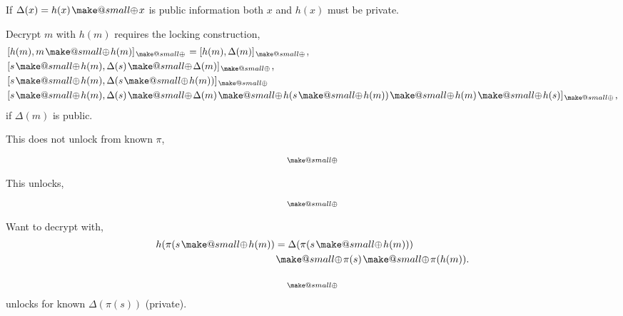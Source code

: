\documentclass[twocolumn, aps, amsmath, amssymb, nofootinbib, superscriptaddress, longbibliography, doublefloatfix, table-of-contents, eqsecnum, rmp]{revtex4-2}
\makeatletter
\newcommand{\soplus}{{{\hspace{1pt}}{\mathbin{\mathpalette\make@small{\mathbin\oplus}}}}{\hspace{1pt}}}
\newcommand{\make@small}[2]{%
  \vcenter{\hbox{%
    \scalebox{0.6}{$\m@th#1#2$}%
  }}%
}
\makeatother
\begin{document}
If $\Delta(x)=h(x)\soplus x$ is public information both $x$ and $h(x)$ must be private.

Decrypt $m$ with $h(m)$ requires the locking construction,
\begin{align}
	&[h(m), m\soplus h(m)]_\soplus	= [h(m), \Delta(m)]_\soplus,\nonumber\\
	&[s\soplus h(m), \Delta(s) \soplus \Delta(m)]_\soplus,\nonumber\\
	&[s\soplus h(m), \Delta(s\soplus h(m))]_\soplus \nonumber\\
	&[s\soplus h(m), \Delta(s) \soplus \Delta(m) \soplus h(s\soplus h(m)) \soplus h(m) \soplus h(s)]_\soplus,\nonumber\\
\end{align}
if $\Delta(m)$ is public.


This does not unlock from known $\pi$,
\begin{align}
	[h(\pi(m)), \pi(m) \soplus h(m)]_\soplus
\end{align}

This unlocks,
\begin{align}
	[h(\pi(s \soplus m)), \Delta(s \soplus m)]_\soplus
\end{align}


Want to decrypt with,
\begin{align}
	h(\pi(s\soplus h(m)) &= \Delta(\pi(s\soplus h(m))) \nonumber\\
	&\soplus \pi(s) \soplus \pi(h(m)).
\end{align}

\begin{align}
	[h(m), \Delta(\pi(m))\soplus \Delta(\pi(s))]_\soplus
\end{align}
unlocks for known $\Delta(\pi(s))$ (private).
\end{document}
